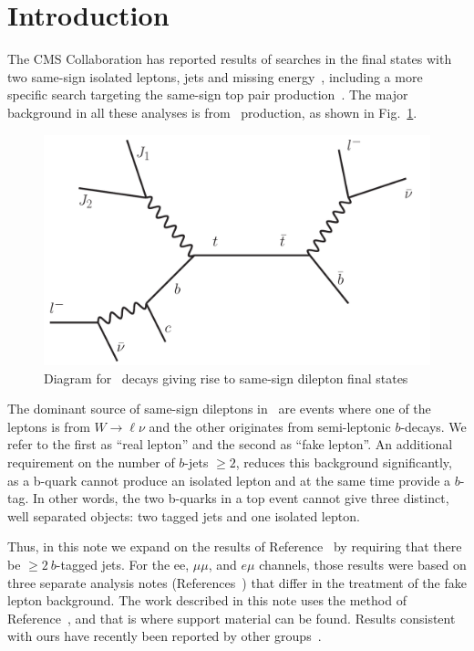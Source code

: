 \section{Introduction}
\label{sec:intro}
The CMS Collaboration has reported results of searches in the final states with two same-sign isolated leptons,
jets and missing energy~\cite{sspaper2010,sspaper2011},
including a more specific search targeting the same-sign top pair production~\cite{sstop}.
The major background in all these analyses is from \ttbar\ production, as shown in Fig.~\ref{fig:ttbar}.

\begin{figure}[htb]
\begin{center}
\includegraphics[width=0.6\linewidth, height=0.35\linewidth]{figs/ttbar.pdf}
\caption{ Diagram for \ttbar\ decays giving rise to same-sign dilepton final states \label{fig:ttbar}}
\end{center}
\end{figure}



The dominant source of same-sign dileptons in \ttbar\ 
are events where 
one of the leptons is from $W \rightarrow \ell \nu $ and the other originates from semi-leptonic $b$-decays. 
We refer to the first as ``real lepton'' and the second as ``fake lepton''.
An additional requirement on the number of $b$-jets $\geq 2$, 
reduces this background significantly,
as a b-quark cannot produce an isolated lepton and at the same time 
provide a $b$-tag.  In other words, the two b-quarks in a top event
cannot give three distinct, well separated objects: two tagged jets
and one isolated lepton.

Thus, in this note we expand on the results of 
Reference~\cite{sspaper2011} by requiring that there
be $ \geq 2\ b$-tagged jets.  For the ee, $\mu\mu$, 
and $e\mu$ 
channels, those results were based on three separate
analysis notes (References~\cite{ssnote2011,ufl,ethss})
that differ
in the treatment of the fake lepton background.
The work described in this note uses the method
of Reference~\cite{ssnote2011}, and that is where support material
can be found. 
Results consistent with ours have recently been reported by 
other groups~\cite{ethss,ufl2}.

